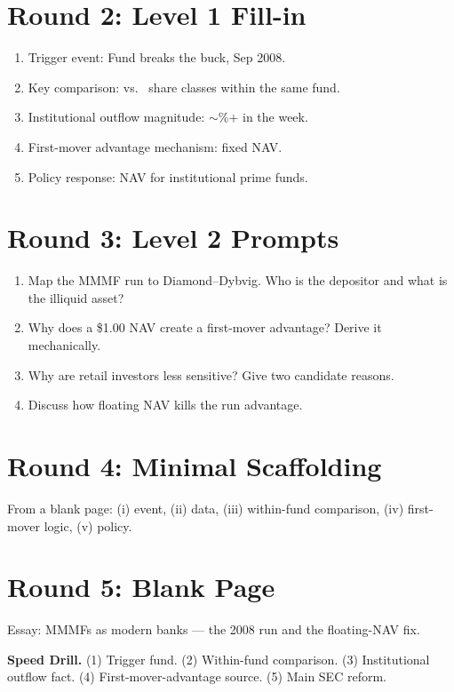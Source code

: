 \documentclass[11pt]{article}
\newcommand{\blank}[1]{\underline{\hspace{#1}}}
\begin{document}
\section*{Round 2: Level 1 Fill-in}
\begin{enumerate}
\item Trigger event: \blank{2cm} Fund breaks the buck, \blank{1cm} Sep 2008.
\item Key comparison: \blank{1.5cm} vs.\ \blank{1cm} share classes within the same fund.
\item Institutional outflow magnitude: $\sim$\blank{1cm}\%$+$ in the week.
\item First-mover advantage mechanism: fixed \blank{1cm} NAV.
\item Policy response: \blank{2cm} NAV for institutional prime funds.
\end{enumerate}

\section*{Round 3: Level 2 Prompts}
\begin{enumerate}
\item Map the MMMF run to Diamond--Dybvig. Who is the depositor and what is the illiquid asset?
\item Why does a \$1.00 NAV create a first-mover advantage? Derive it mechanically.
\item Why are retail investors less sensitive? Give two candidate reasons.
\item Discuss how floating NAV kills the run advantage.
\end{enumerate}

\section*{Round 4: Minimal Scaffolding}
From a blank page: (i) event, (ii) data, (iii) within-fund comparison, (iv) first-mover logic, (v) policy.

\section*{Round 5: Blank Page}
Essay: MMMFs as modern banks --- the 2008 run and the floating-NAV fix.

\vspace{6pt}
\begin{drillbox}
\textbf{Speed Drill.} (1) Trigger fund. (2) Within-fund comparison. (3) Institutional outflow fact. (4) First-mover-advantage source. (5) Main SEC reform.
\end{drillbox}
\end{document}
